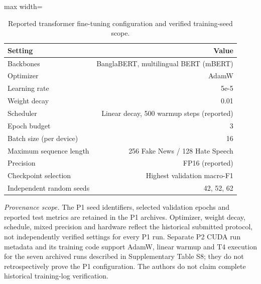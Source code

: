 \begin{table}[H]
\centering
\caption{Reported transformer fine-tuning configuration and verified training-seed scope.}
\label{tab:hyper}
\footnotesize
\begin{adjustbox}{max width=\linewidth}
\begin{tabular}{lr}
\toprule
Setting & Value \\
\midrule
Backbones & BanglaBERT, multilingual BERT (mBERT) \\
Optimizer & AdamW \\
Learning rate & 5e-5 \\
Weight decay & 0.01 \\
Scheduler & Linear decay, 500 warmup steps (reported) \\
Epoch budget & 3 \\
Batch size (per device) & 16 \\
Maximum sequence length & 256 Fake News / 128 Hate Speech \\
Precision & FP16 (reported) \\
Checkpoint selection & Highest validation macro-F1 \\
Independent random seeds & 42, 52, 62 \\
\bottomrule
\end{tabular}
\end{adjustbox}
\par\vspace{2pt}
\begin{minipage}{\linewidth}
\scriptsize\emph{Provenance scope.} The P1 seed identifiers, selected validation epochs and reported test metrics are retained in the P1 archives. Optimizer, weight decay, schedule, mixed precision and hardware reflect the historical submitted protocol, not independently verified settings for every P1 run. Separate P2 CUDA run metadata and its training code support AdamW, linear warmup and T4 execution for the seven archived runs described in Supplementary Table S8; they do not retrospectively prove the P1 configuration. The authors do not claim complete historical training-log verification.
\end{minipage}
\end{table}

